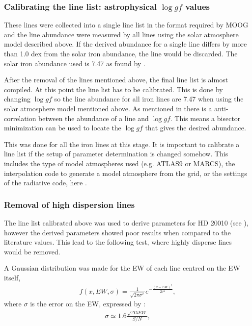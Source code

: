\subsubsection{Calibrating the line list: astrophysical $\log \mathit{gf}$ values}

These lines were collected into a single line list in the format required by MOOG \citep{Sneden1973}
and the line abundance were measured by all lines using the solar atmosphere model described above.
If the derived abundance for a single line differs by more than 1.0 dex from the solar iron
abundance, the line would be discarded. The solar iron abundance used is 7.47 as found by
\citet{Gonzalez2000}. 

After the removal of the lines mentioned above, the final line list is almost compiled. At this
point the line list has to be calibrated. This is done by changing $\log \mathit{gf}$ so the line
abundance for all iron lines are 7.47 when using the solar atmosphere model mentioned above. As
mentioned in  there is a anti-correlation between the abundance of a line and
$\log \mathit{gf}$. This means a bisector minimization can be used to locate the $\log \mathit{gf}$
that gives the desired abundance.

This was done for all the iron lines at this stage. It is important to calibrate a line list if the
setup of parameter determination is changed somehow. This includes the type of model atmospheres
used (e.g. ATLAS9 or MARCS), the interpolation code to generate a model atmosphere from the grid, or
the settings of the radiative code, here \MOOG.


\subsubsection{Removal of high dispersion lines}

The line list calibrated above was used to derive parameters for HD 20010 (see ),
however the derived parameters showed poor results when compared to the literature values. This lead
to the following test, where highly disperse lines would be removed.

A Gaussian distribution was made for the EW of each line centred on the EW itself,
\begin{align}
  f(x, EW, \sigma) = \frac{1}{\sqrt{2\pi\sigma^2}} e^{-\frac{(x-EW)^2}{2\sigma^2}},
\end{align}
where $\sigma$ is the error on the EW, expressed by \citet{Caryel1988}:
\begin{align}
  \sigma \simeq 1.6 \frac{\sqrt{\Delta\lambda EW}}{S/N},
\end{align}

